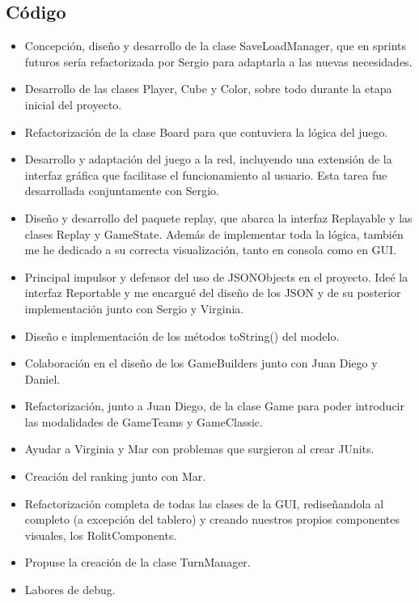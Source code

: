 \documentclass{article}
\begin{document}
\subsection*{Código}
\begin{itemize}
\item Concepción, diseño y desarrollo de la clase SaveLoadManager, que en sprints futuros sería refactorizada por Sergio para adaptarla a las nuevas necesidades.

\item Desarrollo de las clases Player, Cube y Color, sobre todo durante la etapa inicial del proyecto.

\item Refactorización de la clase Board para que contuviera la lógica del juego.

\item Desarrollo y adaptación del juego a la red, incluyendo una extensión de la interfaz gráfica que facilitase el funcionamiento al usuario. Esta tarea fue desarrollada conjuntamente con Sergio.

\item Diseño y desarrollo del paquete replay, que abarca la interfaz Replayable y las clases Replay y GameState. Además de implementar toda la lógica, también me he dedicado a su correcta visualización, tanto en consola como en GUI.

\item Principal impulsor y defensor del uso de JSONObjects en el proyecto. Ideé la interfaz Reportable y me encargué del diseño de los JSON y de su posterior implementación junto con Sergio y Virginia.

\item Diseño e implementación de los métodos toString() del modelo.

\item Colaboración en el diseño de los GameBuilders junto con Juan Diego y Daniel.

\item Refactorización, junto a Juan Diego, de la clase Game para poder introducir las modalidades de GameTeams y GameClassic.

\item Ayudar a Virginia y Mar con problemas que surgieron al crear JUnits.

\item Creación del ranking junto con Mar.

\item Refactorización completa de todas las clases de la GUI, rediseñandola al completo (a excepción del tablero) y creando nuestros propios componentes visuales, los RolitComponents.

\item Propuse la creación de la clase TurnManager.

\item Labores de debug.

\end{itemize}
\end{document}
